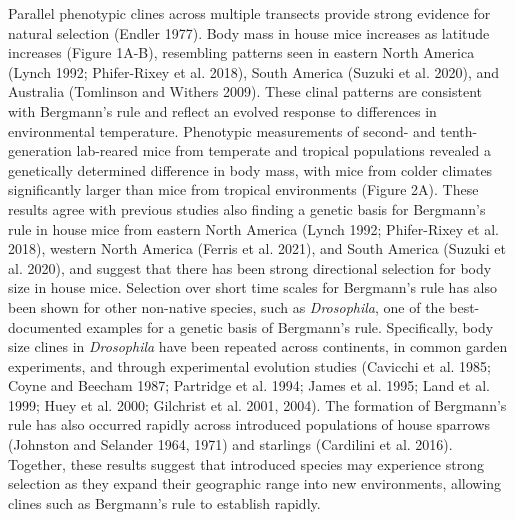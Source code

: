 \documentclass[]{article}
\begin{document}
Parallel phenotypic clines across multiple transects provide strong
evidence for natural selection (Endler 1977). Body mass in house mice
increases as latitude increases (Figure 1A-B), resembling patterns seen
in eastern North America (Lynch 1992; Phifer-Rixey et al. 2018), South
America (Suzuki et al. 2020), and Australia (Tomlinson and Withers
2009). These clinal patterns are consistent with Bergmann's rule and
reflect an evolved response to differences in environmental temperature.
Phenotypic measurements of second- and tenth-generation lab-reared mice
from temperate and tropical populations revealed a genetically
determined difference in body mass, with mice from colder climates
significantly larger than mice from tropical environments (Figure 2A).
These results agree with previous studies also finding a genetic basis
for Bergmann's rule in house mice from eastern North America (Lynch
1992; Phifer-Rixey et al. 2018), western North America (Ferris et al.
2021), and South America (Suzuki et al. 2020), and suggest that there
has been strong directional selection for body size in house mice.
Selection over short time scales for Bergmann's rule has also been shown
for other non-native species, such as \emph{Drosophila}, one of the
best-documented examples for a genetic basis of Bergmann's rule.
Specifically, body size clines in \emph{Drosophila} have been repeated
across continents, in common garden experiments, and through
experimental evolution studies (Cavicchi et al. 1985; Coyne and Beecham
1987; Partridge et al. 1994; James et al. 1995; Land et al. 1999; Huey
et al. 2000; Gilchrist et al. 2001, 2004). The formation of Bergmann's
rule has also occurred rapidly across introduced populations of house
sparrows (Johnston and Selander 1964, 1971) and starlings (Cardilini et
al. 2016). Together, these results suggest that introduced species may
experience strong selection as they expand their geographic range into
new environments, allowing clines such as Bergmann's rule to establish
rapidly.
\end{document}
